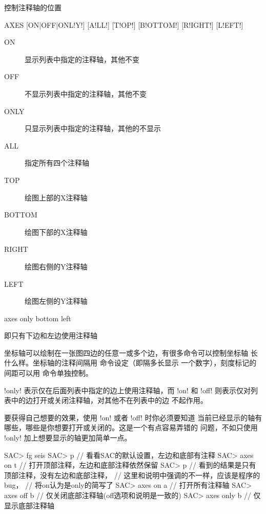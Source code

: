 \label{cmd:axes}

控制注释轴的位置

\begin{SACSTX}
AXES [ON|OFF|ONL!Y!] [A!LL!] [T!OP!] [B!OTTOM!] [R!IGHT!] [L!EFT!]
\end{SACSTX}

\begin{description}
\item [ON] 显示列表中指定的注释轴，其他不变
\item [OFF] 不显示列表中指定的注释轴，其他不变
\item [ONLY] 只显示列表中指定的注释轴，其他的不显示
\item [ALL] 指定所有四个注释轴
\item [TOP] 绘图上部的X注释轴
\item [BOTTOM] 绘图下部的X注释轴
\item [RIGHT] 绘图右侧的Y注释轴
\item [LEFT] 绘图左侧的Y注释轴
\end{description}

\begin{SACDFT}
axes only bottom left
\end{SACDFT}
即只有下边和左边使用注释轴

坐标轴可以绘制在一张图四边的任意一或多个边，有很多命令可以控制坐标轴
长什么样。坐标轴的注释间隔用  命令设定（即隔多长显示
一个数字），刻度标记的间距可以用  命令单独控制。

!only! 表示仅在后面列表中指定的边上使用注释轴，而 !on! 和
!off! 则表示仅对列表中的边打开或关闭注释轴，对其他不在列表中的边
不起作用。

要获得自己想要的效果，使用 !on! 或者 !off! 时你必须要知道
当前已经显示的轴有哪些，哪些是你想要打开或关闭的。这是一个有点容易弄错的
问题，不如只使用 !only! 加上想要显示的轴更加简单一点。

\begin{SACCode}
SAC> fg seis
SAC> p           // 看看SAC的默认设置，左边和底部有注释
SAC> axes on t   // 打开顶部注释，左边和底部注释依然保留
SAC> p           // 看到的结果是只有顶部注释，没有左边和底部注释，
                 // 这里和说明中强调的不一样，应该是程序的bug，
                 // 将on认为是only的简写了
SAC> axes on a   // 打开所有注释轴
SAC> axes off b  // 仅关闭底部注释轴(off选项和说明是一致的)
SAC> axes only b // 仅显示底部注释轴
\end{SACCode}
